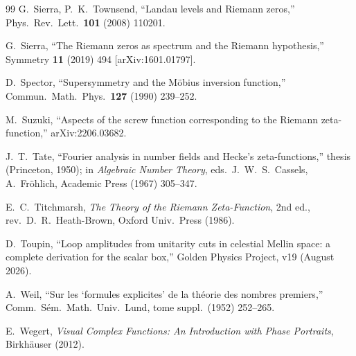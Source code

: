 \documentclass[11pt,a4paper]{article}
\theoremstyle{plain}
\theoremstyle{definition}
\theoremstyle{remark}
\begin{document}
\begin{thebibliography}{99}
 G.~Sierra, P.~K.~Townsend, ``Landau levels and
Riemann zeros,'' Phys.\ Rev.\ Lett.\ \textbf{101} (2008) 110201.

 G.~Sierra, ``The Riemann zeros as spectrum and the Riemann
hypothesis,'' Symmetry \textbf{11} (2019) 494 [arXiv:1601.01797].

 D.~Spector, ``Supersymmetry and the M\"obius inversion
function,'' Commun.\ Math.\ Phys.\ \textbf{127} (1990) 239--252.

 M.~Suzuki, ``Aspects of the screw function corresponding to
the Riemann zeta-function,'' arXiv:2206.03682.

 J.~T.~Tate, ``Fourier analysis in number fields and Hecke's
zeta-functions,'' thesis (Princeton, 1950); in \emph{Algebraic Number Theory},
eds.\ J.~W.~S.~Cassels, A.~Fr\"ohlich, Academic Press (1967) 305--347.

 E.~C.~Titchmarsh, \emph{The Theory of the Riemann
Zeta-Function}, 2nd ed., rev.\ D.~R.~Heath-Brown, Oxford Univ.\ Press (1986).

 D.~Toupin, ``Loop amplitudes from unitarity cuts in
celestial Mellin space: a complete derivation for the scalar box,'' Golden
Physics Project, v19 (August 2026).

 A.~Weil, ``Sur les `formules explicites' de la th\'eorie des
nombres premiers,'' Comm.\ S\'em.\ Math.\ Univ.\ Lund, tome suppl.\ (1952) 252--265.

 E.~Wegert, \emph{Visual Complex Functions: An Introduction
with Phase Portraits}, Birkh\"auser (2012).

\end{thebibliography}
\end{document}
